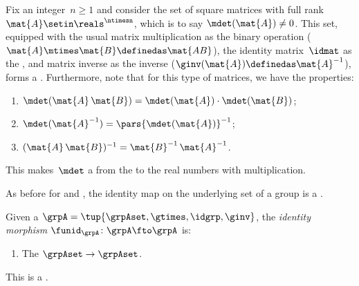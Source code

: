 
\begin{example}
    \label{exa:square-full}
    Fix an integer~$n \geq 1$ and consider the set of square matrices with full rank~$\mat{A} \setin \reals^{\ntimesn}$, which is to say $\mdet(\mat{A}) \neq 0$.
    This set, equipped with the usual matrix multiplication as the binary operation ($\mat{A}\mtimes \mat{B}\definedas \mat{AB}$), the identity matrix~$\idmat$ as the , and matrix inverse as the inverse ($\ginv(\mat{A})\definedas \mat{A}^{-1}$), forms a .
    Furthermore, note that for this type of matrices, we have the properties:
    \begin{enumerate}
        \item $\mdet(\mat{A} \, \mat{B}) = \mdet(\mat{A}) \cdot \mdet(\mat{B})$;
        \item $\mdet(\mat{A}^{-1}) = \pars{ \mdet(\mat{A}) } ^ {-1}$;
        \item $(\mat{A}\,\mat{B})^{-1} = {\mat{B}^{-1} \, \mat{A}^{-1}}$.
    \end{enumerate}
    This makes~$\mdet$ a  from the  to the real numbers with multiplication.
\end{example}

As before for  and , the identity map on the underlying set of a group is a .

\begin{ctdefinition}
    \label{def:identity-grp-mor}
    Given a  $\grpA = \tup{\grpAset, \gtimes, \idgrp, \ginv}$, the \emph{identity morphism} $\funid_\grpA\colon \grpA \fto \grpA$ is:

    \constit
    \begin{enumerate}
        \item The  $\grpAset \to \grpAset$.
    \end{enumerate}
    This is a .
\end{ctdefinition}

